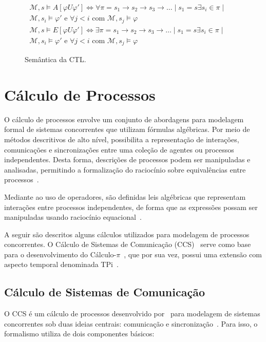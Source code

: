 \begin{figure}[ht]
\begin{eqnarray}
	\mathcal{M},s  \models  A[\varphi U \varphi'] \iff \forall \pi = s_1\to s_2\to s_3\to \dots \mid s_1 = s \exists s_i \in \pi \mid && \\
	\mathcal{M}, s_i \models \varphi' \mbox{ e } \forall j < i \mbox{ com }  \mathcal{M}, s_j \models \varphi && \\
	\mathcal{M},s  \models  E[\varphi U \varphi'] \iff \exists \pi = s_1\to s_2\to s_3\to \dots \mid s_1 = s \exists s_i \in \pi \mid && \\
	\mathcal{M}, s_i \models \varphi' \mbox{ e } \forall j < i \mbox{ com }  \mathcal{M}, s_j \models \varphi &&
	\end{eqnarray}
	\caption{Semântica da CTL.
		\label{fig:ctl_sem}}
\end{figure}
\FloatBarrier

\section{Cálculo de Processos}

O cálculo de processos envolve um conjunto de abordagens para modelagem formal de sistemas concorrentes que utilizam fórmulas algébricas. Por meio de métodos descritivos de alto nível, possibilita a representação de interações, comunicações e sincronizações entre uma coleção de agentes ou processos independentes. Desta forma, descrições de processos podem ser manipuladas e analisadas, permitindo a formalização do raciocínio sobre equivalências entre processos~\cite{baeten2005brief}.

Mediante ao uso de operadores, são definidas leis algébricas que representam interações entre processos independentes, de forma que as expressões possam ser manipuladas usando raciocínio equacional~\cite{baeten2005brief}.

A seguir são descritos alguns cálculos utilizados para modelagem de processos concorrentes. O Cálculo de Sistemas de Comunicação (CCS)~\cite{milner1986ccs} serve como base para o desenvolvimento do Cálculo-$\pi$~\cite{milner1992calculus, milner1992calculus2}, que por sua vez, possui uma extensão com aspecto temporal denominada TPi~\cite{berger2003two}.

\subsection{Cálculo de Sistemas de Comunicação}

O CCS é um cálculo de processos desenvolvido por~\citeauthor{milner1986ccs} para modelagem de sistemas concorrentes sob duas ideias centrais: comunicação e sincronização~\cite{milner1986ccs}. Para isso, o formalismo utiliza de dois componentes básicos:


